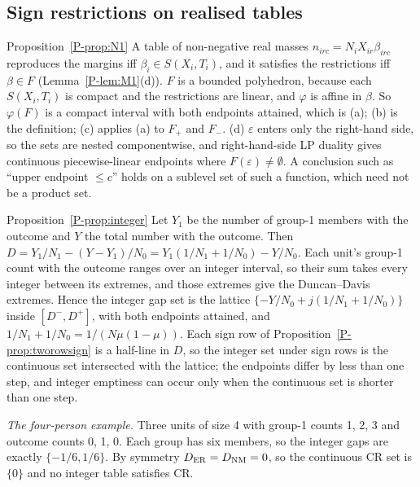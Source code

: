 \subsection{Sign restrictions on realised tables}

\begin{proofof}{Proposition~\ref{P-prop:N1}}
A table of non-negative real masses $n_{irc}=N_iX_{ir}\beta_{irc}$ reproduces the
margins iff $\beta_i\in S(X_i,T_i)$, and it satisfies the restrictions iff $\beta\in F$
(Lemma~\ref{P-lem:M1}(d)). $F$ is a bounded polyhedron, because each $S(X_i,T_i)$ is
compact and the restrictions are linear, and $\varphi$ is affine in $\beta$. So
$\varphi(F)$ is a compact interval with both endpoints attained, which is (a); (b) is the
definition; (c) applies (a) to $F_+$ and $F_-$. (d) $\varepsilon$ enters only the
right-hand side, so the sets are nested componentwise, and right-hand-side LP duality
gives continuous piecewise-linear endpoints where $F(\varepsilon)\ne\emptyset$. A
conclusion such as ``upper endpoint $\le c$'' holds on a sublevel set of such a
function, which need not be a product set.
\end{proofof}

\begin{proofof}{Proposition~\ref{P-prop:integer}}
Let $Y_1$ be the number of group-1 members with the outcome and $Y$ the total number
with the outcome. Then $D=Y_1/N_1-(Y-Y_1)/N_0=Y_1(1/N_1+1/N_0)-Y/N_0$. Each unit's
group-1 count with the outcome ranges over an integer interval, so their sum takes
every integer between its extremes, and those extremes give the Duncan--Davis
extremes. Hence the integer gap set is the lattice $\{-Y/N_0+j(1/N_1+1/N_0)\}$ inside
$[D^-,D^+]$, with both endpoints attained, and $1/N_1+1/N_0=1/(N\mu(1-\mu))$. Each sign
row of Proposition~\ref{P-prop:tworowsign} is a half-line in $D$, so the integer set
under sign rows is the continuous set intersected with the lattice; the endpoints
differ by less than one step, and integer emptiness can occur only when the continuous
set is shorter than one step.
\end{proofof}

\emph{The four-person example.} Three units of size 4 with group-1 counts 1, 2, 3 and
outcome counts 0, 1, 0. Each group has six members, so the integer gaps are exactly
$\{-1/6,1/6\}$. By symmetry $D_{\mathrm{ER}}=D_{\mathrm{NM}}=0$, so the continuous CR set is $\{0\}$ and
no integer table satisfies CR.

